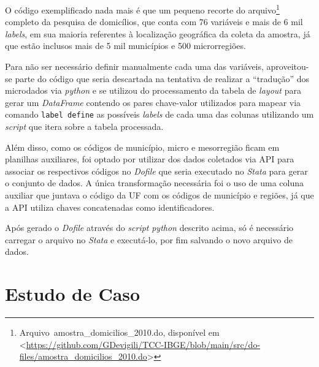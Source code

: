     O código exemplificado nada mais é que um pequeno recorte do arquivo\footnote{Arquivo\ amostra\_domicilios\_2010.do, disponível em <\url{https://github.com/GDevigili/TCC-IBGE/blob/main/src/do-files/amostra_domicilios_2010.do}>} completo da pesquisa de domicílios, que conta com 76 variáveis e mais de 6 mil \textit{labels}, em sua maioria referentes à localização geográfica da coleta da amostra, já que estão inclusos mais de 5 mil municípios e 500 microrregiões.

    Para não ser necessário definir manualmente cada uma das variáveis, aproveitou-se parte do código que seria descartada na tentativa de realizar a ``tradução'' dos microdados via \textit{python} e se utilizou do processamento da tabela de \textit{layout} para gerar um \textit{DataFrame} contendo os pares chave-valor utilizados para mapear via comando \verb|label define| as possíveis \textit{labels} de cada uma das colunas utilizando um \textit{script} que itera sobre a tabela processada.

    Além disso, como os códigos de município, micro e mesorregião ficam em planilhas auxiliares, foi optado por utilizar dos dados coletados via API para associar os respectivos códigos no \textit{Dofile} que seria executado no \textit{Stata} para gerar o conjunto de dados. A única transformação necessária foi o uso de uma coluna auxiliar que juntava o código da UF com os códigos de município e regiões, já que a API utiliza chaves concatenadas como identificadores.

    Após gerado o \textit{Dofile} através do \textit{script} \textit{python} descrito acima, só é necessário carregar o arquivo no \textit{Stata} e executá-lo, por fim salvando o novo arquivo de dados.
    
   


\chapter{Estudo de Caso}